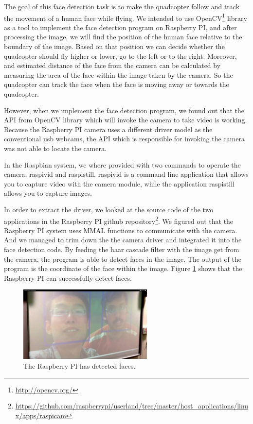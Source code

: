 \documentclass[11pt, a4paper, onecolumn, oneside, parskip=half]{scrartcl}
\begin{document}
The goal of this face detection task is to make the quadcopter follow and track the movement of a human face while flying. We intended to use OpenCV\footnote{\url{http://opencv.org/}} library as a tool to implement the face detection program on Raspberry PI, and after processing the image, we will find the position of the human face relative to the boundary of the image. Based on that position we can decide whether the quadcopter should fly higher or lower, go to the left or to the right. Moreover, and estimated distance of the face from the camera can be calculated by measuring the area of the face within the image taken by the camera. So the quadcopter can track the face when the face is moving away or towards the quadcopter.

However, when we implement the face detection program, we found out that the API from OpenCV library which will invoke the camera to take video is working. Because the Raspberry PI camera uses a different driver model as the conventional usb webcams, the API which is responsible for invoking the camera was not able to locate the camera.

In the Raspbian system, we where provided with two commands to operate the camera; raspivid and raspistill. raspivid is a command line application that allows you to capture video with the camera module, while the application raspistill allows you to capture images.

In order to extract the driver, we looked at the source code of the two applications in the Raspberry PI github repository\footnote{\url{https://github.com/raspberrypi/userland/tree/master/host_applications/linux/apps/raspicam}}. We figured out that the Raspberry PI system uses MMAL functions to communicate with the camera. And we managed to trim down the the camera driver and integrated it into the face detection code. By feeding the haar cascade filter with the image get from the camera, the program is able to detect faces in the image. The output of the program is the coordinate of the face within the image. Figure \ref{fig:raspifaces} shows that the Raspberry PI can successfully detect faces.

\begin{figure}[ht]
\centering
\includegraphics[width=0.6\textwidth]{image02}
\caption{The Raspberry PI has detected faces.}
\label{fig:raspifaces}
\end{figure}
\end{document}

